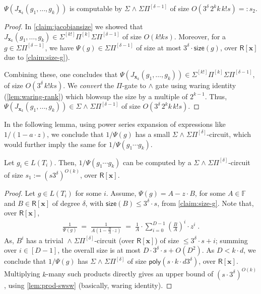 \documentclass[10pt,a4paper]{article}
\newcommand{\poly}{\mathsf{poly}}
\newcommand{\F}{\mathbb{F}}
\newcommand{\ringR}{\mathsf{R}}
\newcommand{\x}{{\boldsymbol x}}
\newcommand{\size}{\mathsf{size}}
\newcommand{\SPSP}[3]{\Sigma^{#1}\Pi^{#2}\Sigma\Pi^{#3}}
\newcommand{\WSP}[2]{\wedge^{#1}\Sigma\Pi^{#2}}
\newcommand{\SWSP}[3]{\Sigma^{#1}\!\wedge^{#2}\!\Sigma\Pi^{#3}}
\numberwithin{equation}{section}
\begin{document}
\begin{lemma} \label{lem:num-size-thm2}
$\Psi(J_{{\x}_k}(g_1,\hdots,g_k))$ is computable by $\SWSP{}{}{[\delta-1]}$ of size $O(3^{\delta}\,2^kk\,k!s)=:s_2$.
\end{lemma}

\begin{proof}
    In \autoref{claim:jacobiansize} we showed that $J_{{\x}_k}(g_1,\hdots,g_k) \in \SPSP{[k!]}{[k]}{[\delta-1]}$ of size $O(k!ks)$. Moreover, for a $g \in \Sigma \Pi^{[\delta-1]}$, we have $\Psi(g) \in \Sigma \Pi^{[\delta-1]}$ of size at most $3^{\delta} \cdot \size(g)$, over $\ringR[\x]$ due to \autoref{claim:size-g}).
    
    Combining these, one concludes that $\Psi(J_{{\x}_k}(g_1,\hdots,g_k)) \in \SPSP{[k!]}{[k]}{[\delta-1]}$, of size $O(3^{\delta}\,k!ks)$. We \emph{convert} the $\Pi$-gate to $\wedge$ gate using waring identity (\autoref{lem:waring-rank}) which blowsup the size by a multiple of $2^{k-1}$. Thus, $\Psi(J_{{\x}_k}(g_1,\hdots,g_k)) \in \SWSP{}{}{[\delta-1]}$ of size $O(3^{\delta}\,2^kk\,k!s)$.
\end{proof}

In the following lemma, using power series expansion of expressions like $1/(1-a\cdot z)$, we conclude that $1/\Psi(g)$ has a small $\SWSP{}{}{[\delta]}$-circuit, which would further imply the same for $1/\Psi(g_1\cdots g_k)$.

\begin{lemma} \label{lem:denom-size-thm2}
Let $g_i \in L(T_i)$. Then, $1/\Psi(g_1\cdots g_k)$ can be computed by a $\SWSP{}{}{[\delta]}$-circuit of size $s_1:=(s3^{\delta})^{O(k)}$, over $\ringR[\x]$.
\end{lemma}

\begin{proof}
Let $g \in L(T_i)$ for some $i$. Assume, $\Psi(g)=A-z\cdot B$, for some $A \in \F$ and $B \in \ringR[\x]$ of degree $\delta$, with $\size(B) \le 3^{\delta} \cdot s$, from \autoref{claim:size-g}. Note that, over $\ringR[\x]$,
\begin{align}
    \frac{1}{\Psi(g)} \;=\; \frac{1}{A(1- \frac{B}{A}\cdot z)}  \;=\; \frac{1}{A} \cdot \sum_{i=0}^{D-1} \left(\frac{B}{A}\right)^{i} \cdot z^i\;.\label{eq:powerseries-1/g-psi}
\end{align}
As, $B^i$ has a trivial $\WSP{}{[\delta]}$-circuit (over $\ringR[\x]$) of size $\le 3^{\delta}\cdot s + i$; summing over $i \in [D-1]$, the overall size is at most $D \cdot 3^{\delta} \cdot s + O(D^2)$. As $D < k \cdot d$, we conclude that $1/\Psi(g)$ has $\SWSP{}{}{[\delta]}$ of size $\poly(s \cdot k \cdot d 3^{\delta})$, over $\ringR[\x]$. Multiplying $k$-many such products directly gives an upper bound of $(s\cdot 3^{\delta})^{O(k)}$, using \autoref{lem:prod-swsw} (basically, waring identity).
\end{proof}
\end{document}
